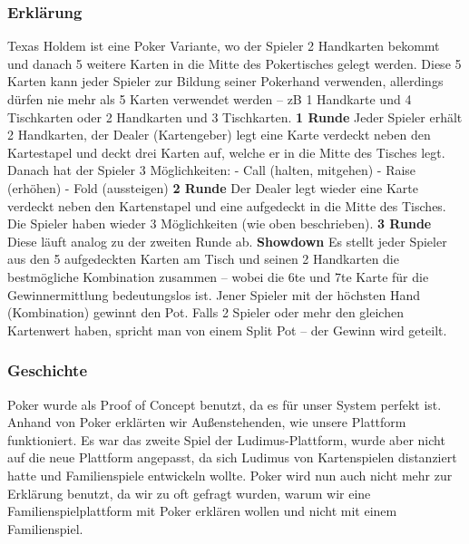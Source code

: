\subsubsection{Erklärung}
Texas Holdem ist eine Poker Variante, wo der Spieler 2 Handkarten bekommt und danach 5 weitere Karten in die Mitte des Pokertisches gelegt werden. Diese 5 Karten kann jeder Spieler zur Bildung seiner Pokerhand verwenden, allerdings dürfen nie mehr als 5 Karten verwendet werden – zB 1 Handkarte und 4 Tischkarten oder 2 Handkarten und 3 Tischkarten. \newline
\textbf{1 Runde} \newline
Jeder Spieler erhält 2 Handkarten, der Dealer (Kartengeber) legt eine Karte verdeckt neben den Kartestapel und deckt drei Karten auf, welche er in die Mitte des Tisches legt. Danach hat der Spieler 3 Möglichkeiten: 
\newline \newline \tab  - Call (halten, mitgehen)
\newline \newline \tab	- Raise (erhöhen)
\newline \newline \tab	- Fold (aussteigen)
\newline \newline
\textbf{2 Runde} \newline
Der Dealer legt wieder eine Karte verdeckt neben den Kartenstapel und eine aufgedeckt in die Mitte des Tisches. Die Spieler haben wieder 3 Möglichkeiten (wie oben beschrieben). \newline
\textbf{3 Runde} \newline
Diese läuft analog zu der zweiten Runde ab. \newline
\textbf{Showdown} \newline
Es stellt jeder Spieler aus den 5 aufgedeckten Karten am Tisch und seinen 2 Handkarten die bestmögliche Kombination zusammen – wobei die 6te und 7te Karte für die Gewinnermittlung bedeutungslos ist.
Jener Spieler mit der höchsten Hand (Kombination) gewinnt den Pot. Falls 2 Spieler oder mehr den gleichen Kartenwert haben, spricht man von einem Split Pot – der Gewinn wird geteilt.
\subsubsection{Geschichte}
Poker wurde als Proof of Concept benutzt, da es für unser System perfekt ist. Anhand von Poker erklärten wir Außenstehenden, wie unsere Plattform funktioniert. Es war das zweite Spiel der Ludimus-Plattform, wurde aber nicht auf die neue Plattform angepasst, da sich Ludimus von Kartenspielen distanziert hatte und Familienspiele entwickeln wollte. Poker wird nun auch nicht mehr zur Erklärung benutzt, da wir zu oft gefragt wurden, warum wir eine Familienspielplattform mit Poker erklären wollen und nicht mit einem Familienspiel.
